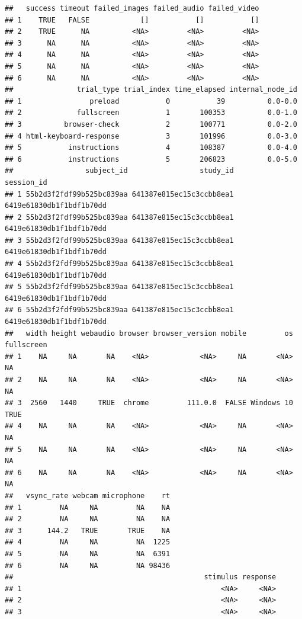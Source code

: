 \documentclass[
]{article}
\begin{document}
\begin{verbatim}
##   success timeout failed_images failed_audio failed_video
## 1    TRUE   FALSE            []           []           []
## 2    TRUE      NA          <NA>         <NA>         <NA>
## 3      NA      NA          <NA>         <NA>         <NA>
## 4      NA      NA          <NA>         <NA>         <NA>
## 5      NA      NA          <NA>         <NA>         <NA>
## 6      NA      NA          <NA>         <NA>         <NA>
##               trial_type trial_index time_elapsed internal_node_id
## 1                preload           0           39          0.0-0.0
## 2             fullscreen           1       100353          0.0-1.0
## 3          browser-check           2       100771          0.0-2.0
## 4 html-keyboard-response           3       101996          0.0-3.0
## 5           instructions           4       108387          0.0-4.0
## 6           instructions           5       206823          0.0-5.0
##                 subject_id                 study_id               session_id
## 1 55b2d3f2fdf99b525bc839aa 641387e815ec15c3ccbb8ea1 6419e61830db1f1bdf1b70dd
## 2 55b2d3f2fdf99b525bc839aa 641387e815ec15c3ccbb8ea1 6419e61830db1f1bdf1b70dd
## 3 55b2d3f2fdf99b525bc839aa 641387e815ec15c3ccbb8ea1 6419e61830db1f1bdf1b70dd
## 4 55b2d3f2fdf99b525bc839aa 641387e815ec15c3ccbb8ea1 6419e61830db1f1bdf1b70dd
## 5 55b2d3f2fdf99b525bc839aa 641387e815ec15c3ccbb8ea1 6419e61830db1f1bdf1b70dd
## 6 55b2d3f2fdf99b525bc839aa 641387e815ec15c3ccbb8ea1 6419e61830db1f1bdf1b70dd
##   width height webaudio browser browser_version mobile         os fullscreen
## 1    NA     NA       NA    <NA>            <NA>     NA       <NA>         NA
## 2    NA     NA       NA    <NA>            <NA>     NA       <NA>         NA
## 3  2560   1440     TRUE  chrome         111.0.0  FALSE Windows 10       TRUE
## 4    NA     NA       NA    <NA>            <NA>     NA       <NA>         NA
## 5    NA     NA       NA    <NA>            <NA>     NA       <NA>         NA
## 6    NA     NA       NA    <NA>            <NA>     NA       <NA>         NA
##   vsync_rate webcam microphone    rt
## 1         NA     NA         NA    NA
## 2         NA     NA         NA    NA
## 3      144.2   TRUE       TRUE    NA
## 4         NA     NA         NA  1225
## 5         NA     NA         NA  6391
## 6         NA     NA         NA 98436
##                                             stimulus response
## 1                                               <NA>     <NA>
## 2                                               <NA>     <NA>
## 3                                               <NA>     <NA>

\end{verbatim}
\end{document}
